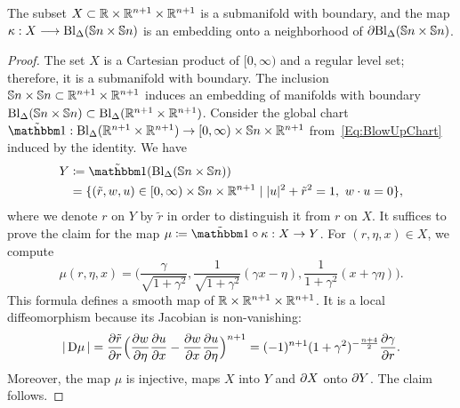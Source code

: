 \documentclass[\MainFolder/Text.tex]{subfiles}
\begin{document}
\begin{Lem} \label{Lem:NewBlowupParam}
The subset $X\subset \mathbb{R}\times \mathbb{R}^{n+1}\times\mathbb{R}^{n+1}$ is a submanifold with boundary, and the map $\kappa: X \longrightarrow \mathrm{Bl}_\Delta(\mathbb{S}{n}\times \mathbb{S}{n})$ is an embedding onto a neighborhood of $\partial \mathrm{Bl}_\Delta(\mathbb{S}{n}\times \mathbb{S}{n})$.
\end{Lem}
%
\begin{proof}
The set $X$ is a Cartesian product of $[0,\infty)$ and a regular level set; therefore, it is a submanifold with boundary. The inclusion $\mathbb{S}{n}\times \mathbb{S}{n} \subset \mathbb{R}^{n+1}\times \mathbb{R}^{n+1}$ induces an embedding of manifolds with boundary $\mathrm{Bl}_\Delta(\mathbb{S}{n}\times\mathbb{S}{n})\subset \mathrm{Bl}_\Delta(\mathbb{R}^{n+1}\times \mathbb{R}^{n+1})$.  Consider the global chart $\tilde{\Id}: \Bl_\Diag(\R^{n+1}\times \R^{n+1}) \rightarrow [0,\infty) \times \Sph{n} \times \R^{n+1}$ from~\eqref{Eq:BlowUpChart} induced by the identity. We have
\[ \begin{aligned}Y &\coloneqq \tilde{\Id}(\Bl_\Diag(\Sph{n}\times \Sph{n})) \\ &= \{(\tilde{r},w,u)\in [0,\infty) \times \Sph{n} \times \R^{n+1} \mid \Abs{u}^2+\tilde{r}^2=1,\ w\cdot u = 0\}, \end{aligned}\] 
where we denote $r$ on $Y$ by $\tilde{r}$ in order to distinguish it from $r$ on $X$. It suffices to prove the claim for the map $\mu\coloneqq \tilde{\Id}\circ\kappa: X \rightarrow Y$. For $(r,\eta,x)\in X$, we compute
\[ \mu(r,\eta,x) = \biggl( \frac{\gamma}{\sqrt{1+\gamma^2}}, \frac{1}{\sqrt{1+\gamma^2}}(\gamma x - \eta), \frac{1}{1+\gamma^2}(x+\gamma \eta) \biggr). \]
This formula defines a smooth map of $\mathbb{R}\times \mathbb{R}^{n+1}\times\mathbb{R}^{n+1}$.
It is a local diffeomorphism because its Jacobian is non-vanishing:
\[ |\Jac{\mu}| = \frac{\partial \tilde{r}}{\partial r} \Bigl(\frac{\partial w}{\partial \eta}\frac{\partial u}{\partial x}  - \frac{\partial w}{\partial x}\frac{\partial u}{\partial \eta}\Bigr)^{n+1} = (-1)^{n+1}(1+\gamma^2)^{-\frac{n+4}{2}} \frac{\partial \gamma}{\partial r}. \]
Moreover, the map $\mu$ is injective, maps $X$ into $Y$ and $\partial X$ onto $\partial Y$. The claim follows.
\end{proof}
\end{document}
